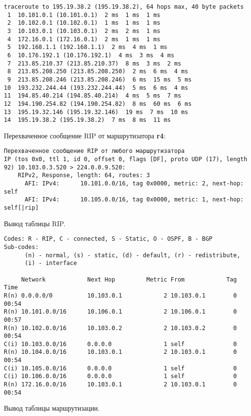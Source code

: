 \documentclass[a4paper,12pt]{article}
\begin{document}
\begin{Verbatim}
traceroute to 195.19.38.2 (195.19.38.2), 64 hops max, 40 byte packets
 1  10.101.0.1 (10.101.0.1)  2 ms  1 ms  1 ms
 2  10.102.0.1 (10.102.0.1)  1 ms  1 ms  1 ms
 3  10.103.0.1 (10.103.0.1)  2 ms  2 ms  1 ms
 4  172.16.0.1 (172.16.0.1)  2 ms  1 ms  1 ms
 5  192.168.1.1 (192.168.1.1)  2 ms  4 ms  1 ms
 6  10.176.192.1 (10.176.192.1)  4 ms  3 ms  4 ms
 7  213.85.210.37 (213.85.210.37)  8 ms  3 ms  2 ms
 8  213.85.208.250 (213.85.208.250)  2 ms  6 ms  4 ms
 9  213.85.208.246 (213.85.208.246)  6 ms  15 ms  5 ms
10  193.232.244.44 (193.232.244.44)  5 ms  6 ms  4 ms
11  194.85.40.214 (194.85.40.214)  4 ms  5 ms  7 ms
12  194.190.254.82 (194.190.254.82)  8 ms  60 ms  6 ms
13  195.19.32.146 (195.19.32.146)  19 ms  7 ms  10 ms
14  195.19.38.2 (195.19.38.2)  7 ms  8 ms  11 ms
\end{Verbatim}

Перехваченное сообщение RIP от маршрутизатора \textbf{r4}:

\begin{Verbatim}
Перехваченное сообщение RIP от любого маршрутизатора
IP (tos 0x0, ttl 1, id 0, offset 0, flags [DF], proto UDP (17), length 92) 10.103.0.3.520 > 224.0.0.9.520: 
	RIPv2, Response, length: 64, routes: 3
	  AFI: IPv4:      10.101.0.0/16, tag 0x0000, metric: 2, next-hop: self
	  AFI: IPv4:      10.105.0.0/16, tag 0x0000, metric: 1, next-hop: self[|rip]
\end{Verbatim}

Вывод таблицы RIP.

\begin{Verbatim}
Codes: R - RIP, C - connected, S - Static, O - OSPF, B - BGP
Sub-codes:
      (n) - normal, (s) - static, (d) - default, (r) - redistribute,
      (i) - interface

     Network            Next Hop         Metric From            Tag Time
R(n) 0.0.0.0/0          10.103.0.1            2 10.103.0.1        0 00:54
R(n) 10.101.0.0/16      10.106.0.1            2 10.106.0.1        0 00:57
R(n) 10.102.0.0/16      10.103.0.2            2 10.103.0.2        0 00:54
C(i) 10.103.0.0/16      0.0.0.0               1 self              0
R(n) 10.104.0.0/16      10.103.0.1            2 10.103.0.1        0 00:54
C(i) 10.105.0.0/16      0.0.0.0               1 self              0
C(i) 10.106.0.0/16      0.0.0.0               1 self              0
R(n) 172.16.0.0/16      10.103.0.1            2 10.103.0.1        0 00:54
\end{Verbatim}

Вывод таблицы маршрутизации.
\end{document}
